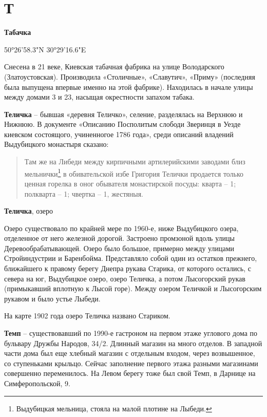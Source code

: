 \chapter*{Т}

\textbf{Табачка}

50°26'58.3"N 30°29'16.6"E

Снесена в 21 веке, Киевская табачная фабрика на улице Володарского (Златоустовская). Производила  «Столичные», «Славутич», «Приму» (последняя была выпущена впервые именно на этой фабрике). Находилась в начале улицы между домами 3 и 23, насыщая окрестности запахом табака.\\

\medskip

\textbf{Теличка} – бывшая «деревня Теличко», селение, разделялась на Верхнюю и Нижнюю. В документе «Описанию Посполитым слободи Зверинця в Уезде киевском состоящого, учиненногое 1786 года», среди описаний владений Выдубицкого монастыря сказано:

\begin{quotation}
Там же на Либеди между кирпичными артилерийскими заводами близ мельнички\footnote{Выдубицкая мельница, стояла на малой плотине на Лыбеди.} в обивательской избе Григория Телички продается только ценная горелка в оног обывателя монастирской посуды: кварта – 1; полкварта – 1; чвертка – 1, жестяныя.
\end{quotation}

\medskip

\textbf{Теличка}, озеро

Озеро существовало по крайней мере по 1960-е, ниже Выдубицкого озера, отделенное от него железной дорогой. Застроено промзоной вдоль улицы Деревообрабатывающей. Озеро было большое, примерно между улицами Стройиндустрии и Баренбойма. Представляло собой один из остатков прежнего, ближайшего к правому берегу Днепра рукава Старика, от которого остались, с севера на юг, Выдубицкое озеро, озеро Теличка, а потом Лысогорский рукав (примыкавший вплотную к Лысой горе). Между озером Теличкой и Лысогорским рукавом и было устье Лыбеди.

На карте 1902 года озеро Теличка названо Стариком.\\

\medskip

\textbf{Темп} – существовавший по 1990-е гастроном на первом этаже углового дома по бульвару Дружбы Народов, 34/2. Длинный магазин на много отделов. В западной части дома был еще хлебный магазин с отдельным входом, через возвышенное, со ступеньками крыльцо. Сейчас заполнение первого этажа разными магазинами совершенно переменилось. На Левом берегу тоже был свой Темп, в Дарнице на Симферопольской, 9.\\

